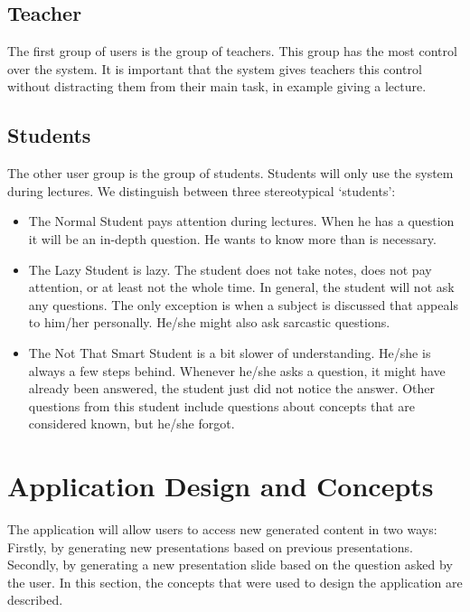 \documentclass[11pt]{article}
\begin{document}
\subsection{Teacher}
The first group of users is the group of teachers. This group has the most control over the system. It is important that the system gives teachers this control without distracting them from their main task, in example giving a lecture.

\subsection{Students}
The other user group is the group of students. Students will only use the system during lectures. We distinguish between three stereotypical `students’:
\begin{itemize}
\item The Normal Student pays attention during lectures. When he has a question it will be an in-depth question. He wants to know more than is necessary.
\item The Lazy Student is lazy. The student does not take notes, does not pay attention, or at least not the whole time. In general, the student will not ask any questions. The only exception is when a subject is discussed that appeals to him/her personally. He/she might also ask sarcastic questions.
\item The Not That Smart Student is a bit slower of understanding. He/she is always a few steps behind. Whenever he/she asks a question, it might have already been answered, the student just did not notice the answer. Other questions from this student include questions about concepts that are considered known, but he/she forgot.
\end{itemize}
\section{Application Design and Concepts}
The application will allow users to access new generated content in two ways: Firstly, by generating new presentations based on previous presentations. Secondly, by generating a new presentation slide based on the question asked by the user. In this section, the concepts that were used to design the application are described.
\end{document}
